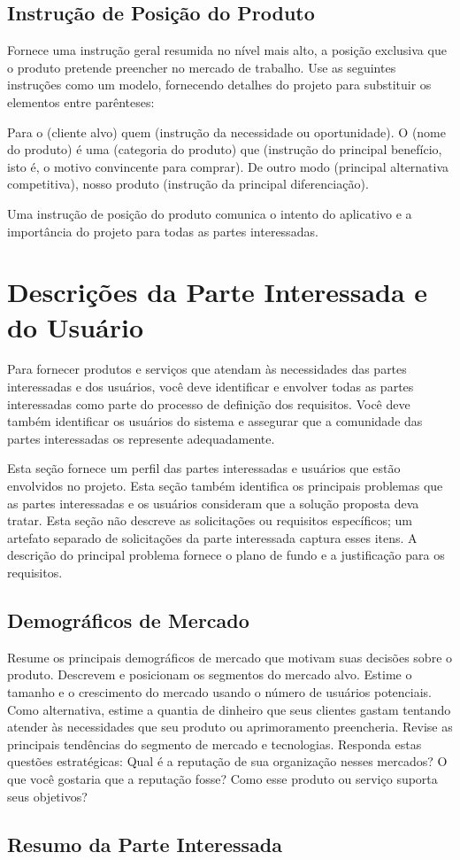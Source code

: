 \documentclass{report}
\begin{document}
\section{Instrução de Posição do Produto}

Fornece uma instrução geral resumida no nível mais alto, a posição exclusiva
que o produto pretende preencher no mercado de trabalho. Use as seguintes
instruções como um modelo, fornecendo detalhes do projeto para substituir os
elementos entre parênteses:

Para o (cliente alvo) quem (instrução da necessidade ou oportunidade). O (nome
do produto) é uma (categoria do produto) que (instrução do principal benefício,
isto é, o motivo convincente para comprar). De outro modo (principal
alternativa competitiva), nosso produto (instrução da principal diferenciação).

Uma instrução de posição do produto comunica o intento do aplicativo e a
importância do projeto para todas as partes interessadas.

\chapter{Descrições da Parte Interessada e do Usuário}

Para fornecer produtos e serviços que atendam às necessidades das partes
interessadas e dos usuários, você deve identificar e envolver todas as partes
interessadas como parte do processo de definição dos requisitos. Você deve
também identificar os usuários do sistema e assegurar que a comunidade das
partes interessadas os represente adequadamente.

Esta seção fornece um perfil das partes interessadas e usuários que estão
envolvidos no projeto. Esta seção também identifica os principais problemas que
as partes interessadas e os usuários consideram que a solução proposta deva
tratar. Esta seção não descreve as solicitações ou requisitos específicos; um
artefato separado de solicitações da parte interessada captura esses itens. A
descrição do principal problema fornece o plano de fundo e a justificação para
os requisitos.

\section{Demográficos de Mercado}

Resume os principais demográficos de mercado que motivam suas decisões sobre o
produto. Descrevem e posicionam os segmentos do mercado alvo. Estime o tamanho
e o crescimento do mercado usando o número de usuários potenciais. Como
alternativa, estime a quantia de dinheiro que seus clientes gastam tentando
atender às necessidades que seu produto ou aprimoramento preencheria. Revise as
principais tendências do segmento de mercado e tecnologias. Responda estas
questões estratégicas: Qual é a reputação de sua organização nesses mercados? O
que você gostaria que a reputação fosse? Como esse produto ou serviço suporta
seus objetivos? \section{Resumo da Parte Interessada}
\end{document}
